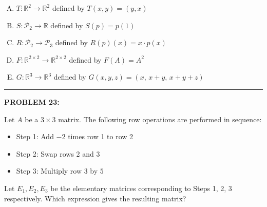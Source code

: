 \documentclass[12pt]{amsart}
\newcommand{\divider}{
  \vspace{-1em} %
  \noindent
  \raisebox{-0.15ex}{\textbullet}%
  \hspace{0.5em}%
  \rule[0.5ex]{0.95\textwidth}{1.0pt}%
  \hspace{0.5em}%
  \raisebox{-0.15ex}{\textbullet}%
  \vspace{0em} %
}
\begin{document}
\begin{enumerate}[(A)]
\item $T: \mathbb{R}^2 \to \mathbb{R}^2$ defined by $T(x,y) = (y, x)$
\item $S: \mathcal{P}_2 \to \mathbb{R}$ defined by $S(p) = p(1)$
\item $R: \mathcal{P}_2 \to \mathcal{P}_3$ defined by $R(p)(x) = x \cdot p(x)$
\item $F: \mathbb{R}^{2 \times 2} \to \mathbb{R}^{2 \times 2}$ defined by $F(A) = A^2$
\item $G: \mathbb{R}^3 \to \mathbb{R}^3$ defined by $G(x,y,z) = (x,\, x+y,\, x+y+z)$
\end{enumerate}


\divider

{\bf PROBLEM 23:}

Let $A$ be a $3 \times 3$ matrix. The following row operations are performed in sequence:
\begin{itemize}
\item Step 1: Add $-2$ times row 1 to row 2
\item Step 2: Swap rows 2 and 3
\item Step 3: Multiply row 3 by $5$
\end{itemize}
Let $E_1, E_2, E_3$ be the elementary matrices corresponding to Steps 1, 2, 3 respectively. Which expression gives the resulting matrix?
\end{document}
